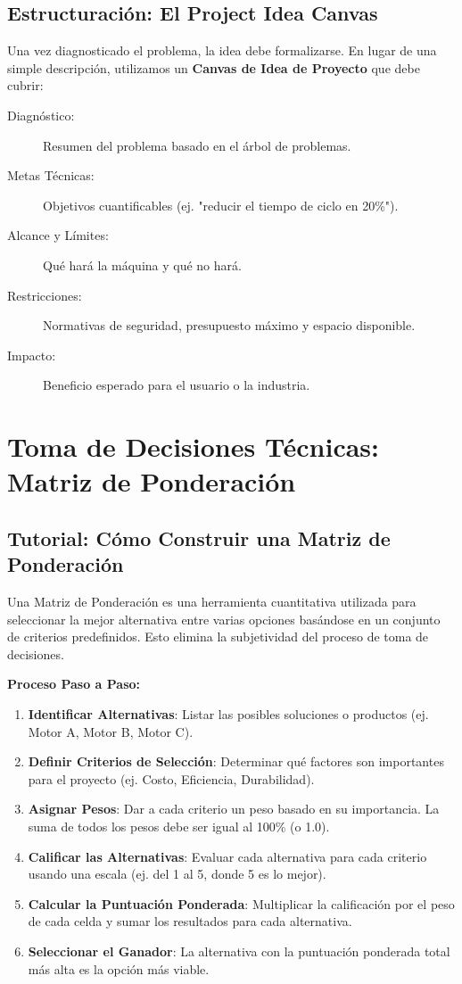 \documentclass[../main]{subfiles}
\begin{document}
\subsection{Estructuración: El Project Idea Canvas}
Una vez diagnosticado el problema, la idea debe formalizarse. En lugar de una simple descripción, utilizamos un \textbf{Canvas de Idea de Proyecto} que debe cubrir:
\begin{description}
  \item[Diagnóstico:] Resumen del problema basado en el árbol de problemas.
  \item[Metas Técnicas:] Objetivos cuantificables (ej. "reducir el tiempo de ciclo en 20\%").
  \item[Alcance y Límites:] Qué hará la máquina y qué no hará.
  \item[Restricciones:] Normativas de seguridad, presupuesto máximo y espacio disponible.
  \item[Impacto:] Beneficio esperado para el usuario o la industria.
\end{description}

\section{Toma de Decisiones Técnicas: Matriz de Ponderación}

\subsection{Tutorial: Cómo Construir una Matriz de Ponderación}
Una Matriz de Ponderación es una herramienta cuantitativa utilizada para seleccionar la mejor alternativa entre varias opciones basándose en un conjunto de criterios predefinidos. Esto elimina la subjetividad del proceso de toma de decisiones.

\textbf{Proceso Paso a Paso:}
\begin{enumerate}
  \item \textbf{Identificar Alternativas}: Listar las posibles soluciones o productos (ej. Motor A, Motor B, Motor C).
  \item \textbf{Definir Criterios de Selección}: Determinar qué factores son importantes para el proyecto (ej. Costo, Eficiencia, Durabilidad).
  \item \textbf{Asignar Pesos}: Dar a cada criterio un peso basado en su importancia. La suma de todos los pesos debe ser igual al 100\% (o 1.0).
  \item \textbf{Calificar las Alternativas}: Evaluar cada alternativa para cada criterio usando una escala (ej. del 1 al 5, donde 5 es lo mejor).
  \item \textbf{Calcular la Puntuación Ponderada}: Multiplicar la calificación por el peso de cada celda y sumar los resultados para cada alternativa.
  \item \textbf{Seleccionar el Ganador}: La alternativa con la puntuación ponderada total más alta es la opción más viable.
\end{enumerate}
\end{document}
